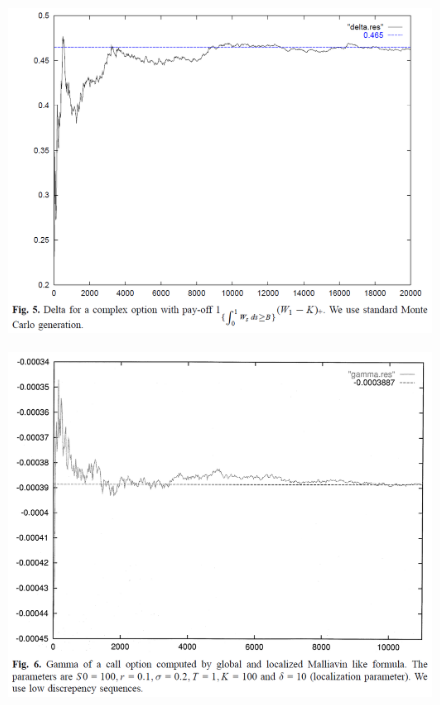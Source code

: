 \documentclass{beamer}
\begin{document}
\begin{frame}
  \begin{figure}
  \centering
  \includegraphics[scale=0.3]{fig5_fournie_99_malliavin_mc.png}\\
\end{figure}
\end{frame}

\begin{frame}
  \begin{figure}
  \centering
  \includegraphics[scale=0.3]{fig6_fournie_99_malliavin_mc.png}\\
\end{figure}
\end{frame}
\end{document}
